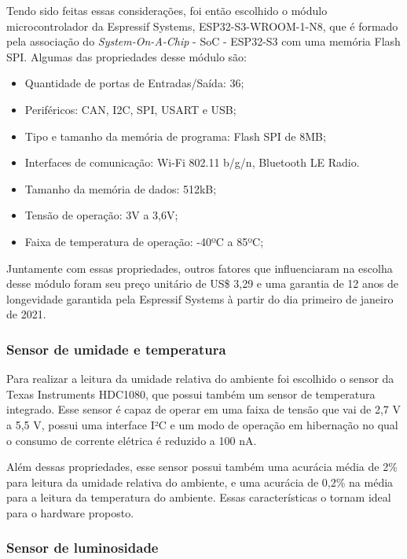 Tendo sido feitas essas considerações, foi então escolhido o módulo microcontrolador da Espressif Systems, ESP32-S3-WROOM-1-N8, que é formado pela associação do \textit{System-On-A-Chip} - SoC - ESP32-S3 com uma memória Flash SPI. Algumas das propriedades desse módulo são:

    \begin{itemize}
        \item Quantidade de portas de Entradas/Saída: 36;
        \item Periféricos: CAN, I2C, SPI, USART e USB;
        \item Tipo e tamanho da memória de programa: Flash SPI de 8MB;
        \item Interfaces de comunicação: Wi-Fi 802.11 b/g/n, Bluetooth LE Radio.
        \item Tamanho da memória de dados: 512kB;
        \item Tensão de operação: 3V a 3,6V;
        \item Faixa de temperatura de operação: -40ºC a 85ºC;
    \end{itemize}
    

Juntamente com essas propriedades, outros fatores que influenciaram na escolha desse módulo foram seu preço unitário de US\$ 3,29 e uma garantia de 12 anos de longevidade garantida pela Espressif Systems à partir do dia primeiro de janeiro de 2021. 

\subsubsection{Sensor de umidade e temperatura}

Para realizar a leitura da umidade relativa do ambiente foi escolhido o sensor da Texas Instruments HDC1080, que possui também um sensor de temperatura integrado. Esse sensor é capaz de operar em uma faixa de tensão que vai de 2,7 V a 5,5 V, possui uma interface I²C e um modo de operação em hibernação no qual o consumo de corrente elétrica é reduzido a 100 nA.

Além dessas propriedades, esse sensor possui também uma acurácia média de 2\% para leitura da umidade relativa do ambiente, e uma acurácia de 0,2\% na média para a leitura da temperatura do ambiente. Essas características o tornam ideal para o hardware proposto.

\subsubsection{Sensor de luminosidade}

